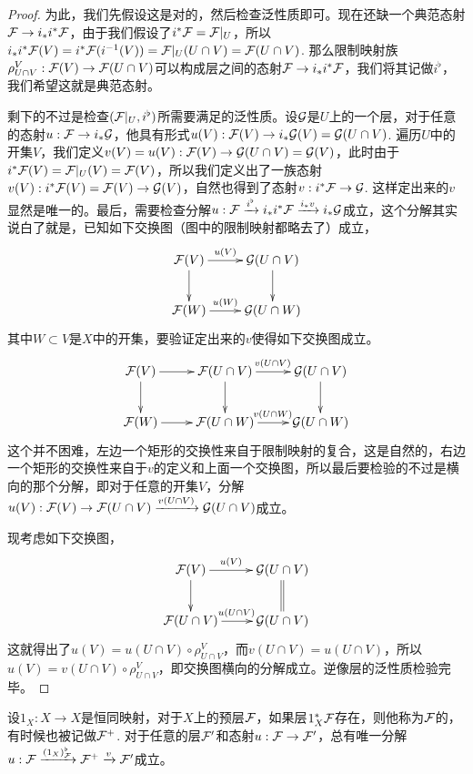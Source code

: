 \begin{proof} 为此，我们先假设这是对的，然后检查泛性质即可。现在还缺一个典范态射$\mathcal{F}\to i_*i^*\mathcal{F}$，由于我们假设了$i^*\mathcal{F}=\mathcal{F}|_U$，所以$i_*i^*\mathcal{F}(V)=i^*\mathcal{F}(i^{-1}(V))=\mathcal{F}|_U(U\cap V)=\mathcal{F}(U\cap V)$. 那么限制映射族$\rho^V_{U\cap V}:\mathcal{F}(V)\to \mathcal{F}(U\cap V)$可以构成层之间的态射$\mathcal{F}\to i_*i^*\mathcal{F}$，我们将其记做$i^\flat$，我们希望这就是典范态射。

剩下的不过是检查$(\mathcal{F}|_U,i^\flat)$所需要满足的泛性质。设$\mathcal{G}$是$U$上的一个层，对于任意的态射$u:\mathcal{F}\to i_*\mathcal{G}$，他具有形式$u(V):\mathcal{F}(V)\to i_*\mathcal{G}(V)=\mathcal{G}(U\cap V)$. 遍历$U$中的开集$V$，我们定义$v(V)=u(V):\mathcal{F}(V)\to \mathcal{G}(U\cap V)=\mathcal{G}(V)$，此时由于$i^*\mathcal{F}(V)=\mathcal{F}|_U(V)=\mathcal{F}(V)$，所以我们定义出了一族态射$v(V):i^*\mathcal{F}(V)=\mathcal{F}(V)\to \mathcal{G}(V)$，自然也得到了态射$v:i^*\mathcal{F}\to \mathcal{G}$. 这样定出来的$v$显然是唯一的。最后，需要检查分解$u:\mathcal{F}\xrightarrow{i^\flat} i_*i^*\mathcal{F} \xrightarrow{i_*v} i_*\mathcal{G}$成立，这个分解其实说白了就是，已知如下交换图（图中的限制映射都略去了）成立，
\[
	\xymatrix{
		\calf(V)\ar[r]^-{u(V)} \ar[d]&\calg(U\cap V) \ar[d]\\
		\calf(W)\ar[r]^-{u(W)}&\calg(U\cap W)
	}
\]
其中$W\subset V$是$X$中的开集，要验证定出来的$v$使得如下交换图成立。
\[
	\xymatrix{
		\calf(V)\ar[r] \ar[d]&\ar[r]^{v(U\cap V)}\calf(U\cap V) \ar[d]&\calg(U\cap V) \ar[d]\\
		\calf(W)\ar[r]&\ar[r]^{v(U\cap W)}\calf(U\cap W)&\calg(U\cap W)
	}
\]
这个并不困难，左边一个矩形的交换性来自于限制映射的复合，这是自然的，右边一个矩形的交换性来自于$v$的定义和上面一个交换图，所以最后要检验的不过是横向的那个分解，即对于任意的开集$V$，分解$u(V):\mathcal{F}(V)\to \mathcal{F}(U\cap V) \xrightarrow{v(U\cap V)} \mathcal{G}(U\cap V)$成立。

现考虑如下交换图，
\[
	\xymatrix{
		\calf(V)\ar[r]^-{u(V)} \ar[d]&\calg(U\cap V) \ar@{=}[d]\\
		\calf(U\cap V)\ar[r]^{u(U\cap V)}&\calg(U\cap V)
	}
\]
这就得出了$u(V)=u(U\cap V)\circ \rho^V_{U\cap V}$，而$v(U\cap V)=u(U\cap V)$，所以$u(V)=v(U\cap V)\circ \rho^V_{U\cap V}$，即交换图横向的分解成立。逆像层的泛性质检验完毕。
\end{proof}

\begin{para}
设$1_X:X\to X$是恒同映射，对于$X$上的预层$\mathcal{F}$，如果层$1_X^*\mathcal{F}$存在，则他称为$\mathcal{F}$的，有时候也被记做$\mathcal{F}^+$. 对于任意的层$\mathcal{F}'$和态射$u:\mathcal{F}\to\mathcal{F}'$，总有唯一分解$u:\mathcal{F}\xrightarrow{(1_X)^\flat_{\mathcal{F}}} \mathcal{F}^+ \xrightarrow{v} \mathcal{F}'$成立。
\end{para}

